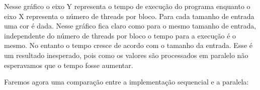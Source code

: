 \documentclass[12pt]{article}
\begin{document}
\begin{figure}[H]
\end{figure}

Nesse gráfico o eixo Y representa o tempo de execução do programa enquanto o eixo X representa o número de threads por bloco. Para cada tamanho de entrada uma cor é dada. Nesse gráfico fica claro como para o mesmo tamanho de entrada, independente do número de threads por bloco o tempo para a execução é o mesmo. No entanto o tempo cresce de acordo com o tamanho da entrada. Esse é um resultado inesperado, pois como os valores são processados em paralelo não esperavamos que o tempo fosse aumentar.

Faremos agora uma comparação entre a implementação sequencial e a paralela:

\begin{figure}[H]
\end{figure}
\end{document}
